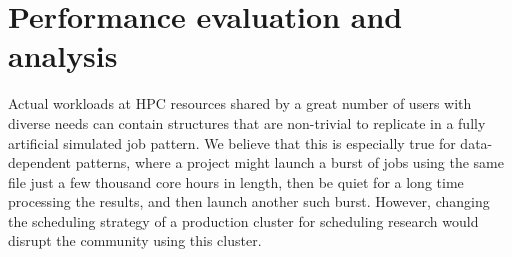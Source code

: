 \documentclass[conference,10pt]{IEEEtran}
\begin{document}


\section{Performance evaluation and analysis}\label{sec.evaluations}

Actual workloads at HPC resources shared by a great number of users with diverse needs can contain structures
that are non-trivial to replicate in a fully artificial simulated job pattern. We believe that this is especially
true for data-dependent patterns, where a project might launch a burst of jobs using the same file just a few thousand
core hours in length, then be quiet for a long time processing the results, and then launch another such burst.
However, changing the scheduling strategy of a production cluster for
scheduling research would disrupt the community using this cluster.
\end{document}

